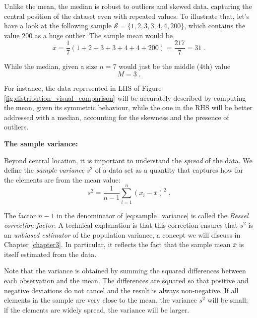 Unlike the mean, the median is robust to outliers and skewed data, capturing the central position of the dataset even with repeated values. To illustrate that, let's have a look at the following sample $\mathcal{S} = \{1, 2, 3, 3, 4, 4, 200\}$, which contains the value $200$ as a huge outlier. The sample mean would be
\begin{equation}
	\bar{x} = \frac{1}{7}(1 + 2 + 3 + 3 + 4 + 4 + 200) = \frac{217}{7} = 31 \; . \nonumber
\end{equation}

While the median, given a size $n = 7$ would just be the middle (4th) value
\begin{equation}
    M = 3 \; . \nonumber
\end{equation}

For instance, the data represented in LHS of Figure \ref{fig:distribution_visual_comparison} will be accurately described by computing the mean, given its symmetric behaviour, while the one in the RHS will be better addressed with a median, accounting for the skewness and the presence of outliers.

\medskip

\textbf{The sample variance:}

\medskip

Beyond central location, it is important to understand the \textit{spread} of the data. We define the \textit{sample variance} $s^2$ of a data set as a quantity that captures how far the elements are from the mean value:
\begin{equation}
	s^2 = \frac{1}{n - 1} \sum_{i = 1}^{n} (x_{i} - \bar{x})^{2} \; .
	\label{eq:sample_variance}
\end{equation}

The factor $n - 1$ in the denominator of \eqref{eq:sample_variance} is called the \textit{Bessel correction factor}. A technical explanation is that this correction ensures that $s^2$ is an \textit{unbiased estimator} of the population variance, a concept we will discuss in Chapter \ref{chapter3}. In particular, it reflects the fact that the sample mean $\bar{x}$ is itself estimated from the data.

\medskip

Note that the variance is obtained by summing the squared differences between each observation and the mean. The differences are squared so that positive and negative deviations do not cancel and the result is always non-negative. If all elements in the sample are very close to the mean, the variance $s^2$ will be small; if the elements are widely spread, the variance will be larger.

